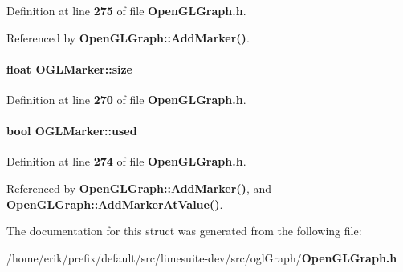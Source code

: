 Definition at line {\bf 275} of file {\bf Open\+G\+L\+Graph.\+h}.



Referenced by {\bf Open\+G\+L\+Graph\+::\+Add\+Marker()}.

\paragraph[{size}]{\setlength{\rightskip}{0pt plus 5cm}float O\+G\+L\+Marker\+::size}\label{structOGLMarker_a75843012dd0514fdf6b96c466b0eee30}


Definition at line {\bf 270} of file {\bf Open\+G\+L\+Graph.\+h}.

\paragraph[{used}]{\setlength{\rightskip}{0pt plus 5cm}bool O\+G\+L\+Marker\+::used}\label{structOGLMarker_a3130e62079d6ecb117c1ea756ba65a70}


Definition at line {\bf 274} of file {\bf Open\+G\+L\+Graph.\+h}.



Referenced by {\bf Open\+G\+L\+Graph\+::\+Add\+Marker()}, and {\bf Open\+G\+L\+Graph\+::\+Add\+Marker\+At\+Value()}.



The documentation for this struct was generated from the following file\+:\begin{DoxyCompactItemize}
\item 
/home/erik/prefix/default/src/limesuite-\/dev/src/ogl\+Graph/{\bf Open\+G\+L\+Graph.\+h}\end{DoxyCompactItemize}

